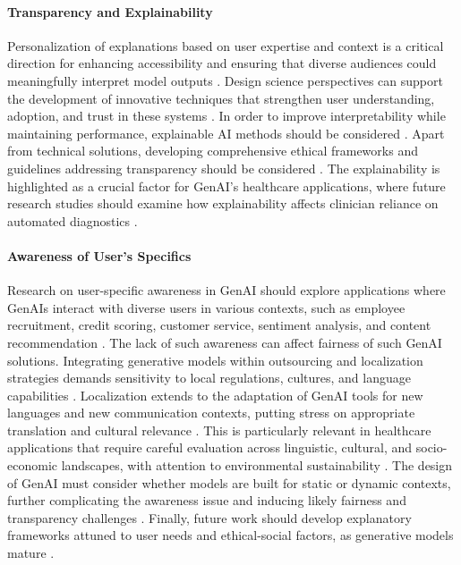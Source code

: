 \paragraph{Transparency and Explainability}
Personalization of explanations based on user expertise and context is a critical direction for enhancing accessibility and ensuring that diverse audiences could meaningfully interpret model outputs \parencite{S18, S09, R08}. 
Design science perspectives can support the development of innovative techniques that strengthen user understanding, adoption, and trust in these systems \parencite{R02, S17}. In order to improve interpretability while maintaining performance, explainable AI methods should be considered \parencite{R01, R02}. Apart from technical solutions, developing comprehensive ethical frameworks and guidelines addressing transparency should be considered \parencite{S12}.
The explainability is highlighted as a crucial factor for GenAI's healthcare applications, where future research studies should examine how explainability affects clinician reliance on automated diagnostics \parencite{R09, S01, S07, S16}. 


\paragraph{Awareness of User’s Specifics}
Research on user-specific awareness in GenAI should explore applications where GenAIs interact with diverse users in various contexts, such as employee recruitment, credit scoring, customer service, sentiment analysis, and content recommendation \parencite{R01}. The lack of such awareness can affect fairness of such GenAI solutions.
Integrating generative models within outsourcing and localization strategies demands sensitivity to local regulations, cultures, and language capabilities \parencite{R03}. Localization extends to the adaptation of GenAI tools for new languages and new communication contexts, putting stress on appropriate translation and cultural relevance \parencite{S11}.
This is particularly relevant in healthcare applications that require careful evaluation across linguistic, cultural, and socio-economic landscapes, with attention to environmental sustainability \parencite{S17}. The design of GenAI must consider whether models are built for static or dynamic contexts, further complicating the awareness issue and inducing likely fairness and transparency challenges \parencite{R07}. Finally, future work should develop explanatory frameworks attuned to user needs and ethical-social factors, as generative models mature \parencite{S18}.

